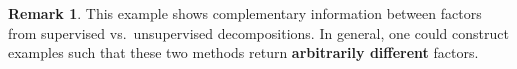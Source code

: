 \documentclass[11pt]{article}
\theoremstyle{plain}
\theoremstyle{definition}
\newtheorem{rmk}{Remark}
\begin{document}
\begin{enumerate}[wide, labelwidth=!, labelindent=0pt]
\begin{rmk}
This example shows complementary information between factors from supervised vs.\ unsupervised decompositions. In general, one could construct examples such that these two methods return {\bf arbitrarily different} factors.   
\end{rmk}

\end{enumerate}



\end{document}
